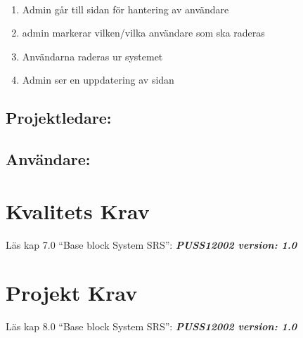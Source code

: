 \documentclass[paper=a4, fontsize=11pt,twoside]{article}
\begin{document}
\paragraph{}
\begin{enumerate}
\item Admin går till sidan för hantering av användare
\item admin markerar vilken/vilka användare som ska raderas
\item Användarna raderas ur systemet
\item Admin ser en uppdatering av sidan
\end{enumerate}

\subsection{Projektledare:}
\subsection{Användare:}
\section{Kvalitets Krav}
Läs kap 7.0  “Base block System SRS”:   \textbf{\textit{PUSS12002 version: 1.0}} 
\section{Projekt Krav}
Läs kap 8.0  “Base block System SRS”:   \textbf{\textit{PUSS12002 version: 1.0}} 
\end{document}
